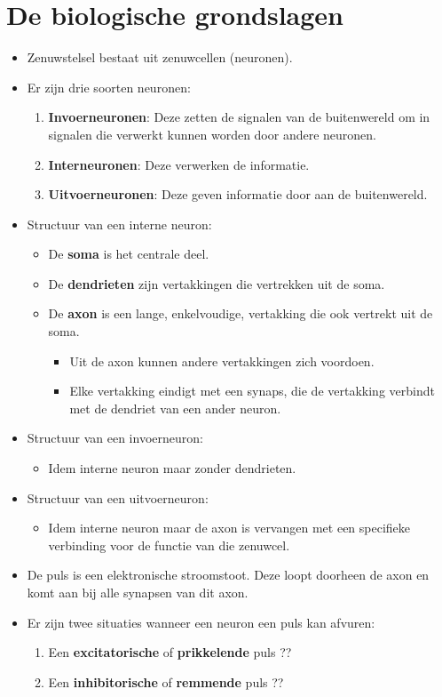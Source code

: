 \section{De biologische grondslagen}
\begin{itemize}
	\item Zenuwstelsel bestaat uit zenuwcellen (neuronen).
	\item Er zijn drie soorten neuronen:
	\begin{enumerate}
		\item \textbf{Invoerneuronen}: Deze zetten de signalen van de buitenwereld om in signalen die verwerkt kunnen worden door andere neuronen.
		\item \textbf{Interneuronen}: Deze verwerken de informatie.
		\item \textbf{Uitvoerneuronen}: Deze geven informatie door aan de buitenwereld.
	\end{enumerate}
	\item Structuur van een interne neuron:
	\begin{itemize}
		\item De \textbf{soma} is het centrale deel.
		\item De \textbf{dendrieten} zijn vertakkingen die vertrekken uit de soma.
		\item De \textbf{axon} is een lange, enkelvoudige, vertakking die ook vertrekt uit de soma.
		\begin{itemize}
			\item Uit de axon kunnen andere vertakkingen zich voordoen.
			\item Elke vertakking eindigt met een synaps, die de vertakking verbindt met de dendriet van een ander neuron.
		\end{itemize}
	\end{itemize}
	\item Structuur van een invoerneuron:
	\begin{itemize}
		\item Idem interne neuron maar zonder dendrieten.
	\end{itemize}
	\item Structuur van een uitvoerneuron:
	\begin{itemize}
		\item Idem interne neuron maar de axon is vervangen met een specifieke verbinding voor de functie van die zenuwcel.
	\end{itemize}
	\item De puls is een elektronische stroomstoot. Deze loopt doorheen de axon en komt aan bij alle synapsen van dit axon.
	\item Er zijn twee situaties wanneer een neuron een puls kan afvuren:
	\begin{enumerate}
		\item Een \textbf{excitatorische} of \textbf{prikkelende} puls ?? 
		\item Een \textbf{inhibitorische} of \textbf{remmende} puls ??
	\end{enumerate}

\end{itemize}